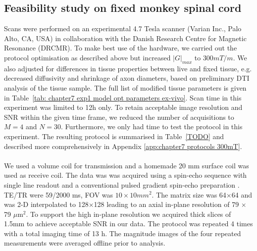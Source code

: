 \subsection{Feasibility study on fixed monkey spinal cord}
Scans were performed on an experimental 4.7 Tesla scanner (Varian Inc., Palo Alto, CA, USA) in collaboration with the Danish Research Centre for Magnetic Resonance (DRCMR). To make best use of the hardware, we carried out the protocol optimisation as described above but increased $|G|_{max}$ to $300mT/m$. We also adjusted for differences in tissue properties between live and fixed tissue, e.g. decreased diffusivity and shrinkage of axon diameters, based on preliminary \gls{DTI} analysis of the tissue sample. The full list of modified tissue parameters is given in Table~\ref{tab: chapter7 exp1 model opt parameters ex-vivo}. Scan time in this experiment was limited to 12h only. To retain acceptable image resolution and \gls{SNR} within the given time frame, we reduced the number of acquisitions to $M=4$ and $N=30$. Furthermore, we only had time to test the {\FD} protocol in this experiment. The resulting protocol is summarised in Table~\ref{TODO} and described more comprehensively in Appendix \ref{app:chapter7 protocols 300mT}. 
\paragraph{}
We used a volume coil for transmission and a homemade 20 mm surface coil was used as receive coil. The data was was acquired using a spin-echo sequence with single line readout and a conventional pulsed gradient spin-echo preparation \citep{Stejskal:1965}.  TE/TR were 59/2000 ms, \gls{FOV} was $10\times 10 mm^2$. The matrix size was 64$\times$64 and was 2-D interpolated to 128$\times$128 leading to an axial in-plane resolution of 79 $\times$ 79 $\mu$m$^2$. To support the high in-plane resolution we acquired thick slices of 1.5mm to achieve acceptable \gls{SNR} in our data. The protocol was repeated 4 times with a total imaging time of 13 h. The magnitude images of the four repeated measurements were averaged offline prior to analysis.

